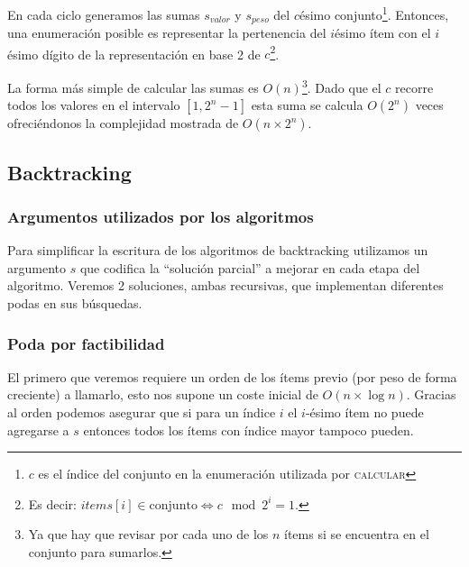 \documentclass[fleqn, 11pt]{article}
\begin{document}
En cada ciclo generamos las sumas $s_{valor}$ y $s_{peso}$ del $c$ésimo
conjunto\footnote{$c$ es el índice del conjunto en la enumeración utilizada por
\textsc{calcular}}. Entonces, una enumeración posible es representar la
pertenencia del $i$ésimo ítem con el $i$ésimo dígito de la representación en
base 2 de $c$\footnote{Es decir: $items[i] \in \text{conjunto} \iff c \mod 2^i
= 1$.}.

La forma más simple de calcular las sumas es $O(n)$\footnote{Ya que hay que
revisar por cada uno de los $n$ ítems si se encuentra en el conjunto para
sumarlos.}.  Dado que el $c$ recorre todos los valores en el intervalo $[1,2^n
- 1]$ esta suma se calcula $O(2^n)$ veces ofreciéndonos la complejidad mostrada
de $O(n \times 2^n)$.

\subsection{Backtracking}
\subsubsection{Argumentos utilizados por los algoritmos}

Para simplificar la escritura de los algoritmos de backtracking utilizamos un
argumento $s$ que codifica la ``solución parcial'' a mejorar en cada etapa del
algoritmo. Veremos 2 soluciones, ambas recursivas, que implementan diferentes
podas en sus búsquedas.

\subsubsection{Poda por factibilidad}

El primero que veremos requiere un orden de los ítems previo (por peso de forma
creciente) a llamarlo, esto nos supone un coste inicial de $O(n \times \log
n)$. Gracias al orden podemos asegurar que si para un índice $i$ el $i$-ésimo
ítem no puede agregarse a $s$ entonces todos los ítems con índice mayor tampoco
pueden.
\end{document}
